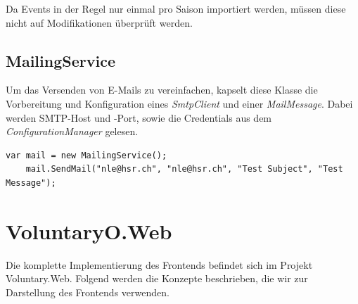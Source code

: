 			\noindent
			Da Events in der Regel nur einmal pro Saison importiert werden, müssen diese nicht auf Modifikationen überprüft werden.
	
	\subsection{MailingService}
		Um das Versenden von E-Mails zu vereinfachen, kapselt diese Klasse die Vorbereitung und Konfiguration eines \textit{SmtpClient} und einer \textit{MailMessage}. Dabei werden SMTP-Host und -Port, sowie die Credentials aus dem \textit{ConfigurationManager} gelesen.  

		\begin{lstlisting}[language=CSharp, caption=Verwendung des MailingService, label=lst:mailingservice, firstnumber=1]
	var mail = new MailingService();
	mail.SendMail("nle@hsr.ch", "nle@hsr.ch", "Test Subject", "Test Message");
	    \end{lstlisting}
    



\section{VoluntaryO.Web}
	Die komplette Implementierung des Frontends befindet sich im Projekt Voluntary.Web. Folgend werden die Konzepte beschrieben, die wir zur Darstellung des Frontends verwenden.

